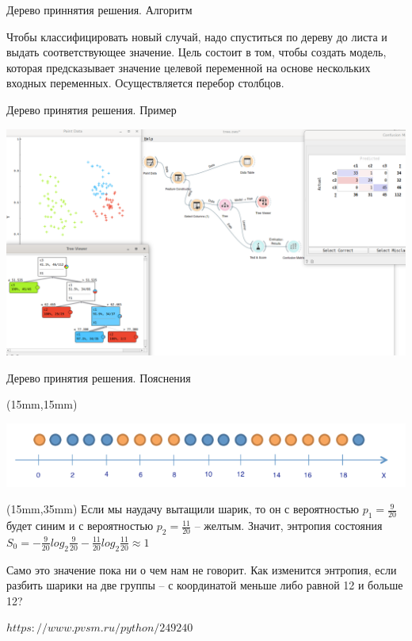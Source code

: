 \documentclass{beamer}
\begin{document}
\begin{frame}{Дерево приннятия решения. Алгоритм}


Чтобы классифицировать новый случай, надо спуститься по дереву до листа и выдать соответствующее значение. 
Цель состоит в том, чтобы создать модель, которая предсказывает значение целевой 
переменной на основе нескольких входных переменных. Осуществляется перебор  столбцов.
\end{frame}

\begin{frame}{Дерево принятия решения. Пример}


\includegraphics[scale=0.2]{task08_01.png}

\end{frame}


\begin{frame}{Дерево принятия решения. Пояснения}


\begin{textblock*}{120mm}(15mm,15mm)
 

\includegraphics[scale=0.4]{ris_02.png}

\end{textblock*} 


\begin{textblock*}{90mm}(15mm,35mm)
Если мы наудачу вытащили шарик, 
то он с вероятностью $ p_1=\frac{9}{20} $ будет синим и с вероятностью $ p_2=\frac{11}{20} $ – желтым. 
Значит, энтропия состояния  $S_0=-\frac{9}{20}log_2{\frac{9}{20}}-\frac{11}{20}log_2{\frac{11}{20}} \approx 1$

Само это значение пока ни о чем нам не говорит. 
Как изменится энтропия, если разбить шарики на две группы – с координатой меньше либо равной 12 и больше 12?

$https://www.pvsm.ru/python/249240$
\end{textblock*} 


\end{frame}
\end{document}

